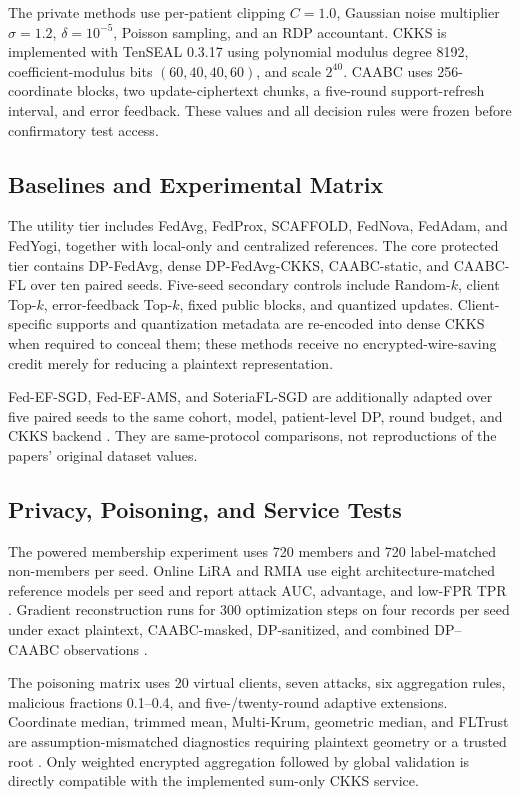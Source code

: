 \documentclass[conference]{IEEEtran}
\begin{document}
The private methods use per-patient clipping $C=1.0$, Gaussian noise multiplier
$\sigma=1.2$, $\delta=10^{-5}$, Poisson sampling, and an RDP accountant. CKKS is
implemented with TenSEAL 0.3.17 using polynomial modulus degree 8192,
coefficient-modulus bits $(60,40,40,60)$, and scale $2^{40}$. CAABC uses
256-coordinate blocks, two update-ciphertext chunks, a five-round support-refresh
interval, and error feedback. These values and all decision rules were frozen
before confirmatory test access.

\subsection{Baselines and Experimental Matrix}

The utility tier includes FedAvg, FedProx, SCAFFOLD, FedNova, FedAdam, and
FedYogi, together with local-only and centralized references. The core protected
tier contains DP-FedAvg, dense DP-FedAvg-CKKS, CAABC-static, and CAABC-FL over ten
paired seeds. Five-seed secondary controls include Random-$k$, client Top-$k$,
error-feedback Top-$k$, fixed public blocks, and quantized updates. Client-specific
supports and quantization metadata are re-encoded into dense CKKS when required
to conceal them; these methods receive no encrypted-wire-saving credit merely
for reducing a plaintext representation.

Fed-EF-SGD, Fed-EF-AMS, and SoteriaFL-SGD are additionally adapted over five
paired seeds to the same cohort, model, patient-level DP, round budget, and CKKS
backend \cite{li2023fedef,li2022soteriafl}. They are same-protocol comparisons,
not reproductions of the papers' original dataset values.

\subsection{Privacy, Poisoning, and Service Tests}

The powered membership experiment uses 720 members and 720 label-matched
non-members per seed. Online LiRA and RMIA use eight architecture-matched
reference models per seed and report attack AUC, advantage, and low-FPR TPR
\cite{carlini2022membership}. Gradient reconstruction runs for 300 optimization
steps on four records per seed under exact plaintext, CAABC-masked,
DP-sanitized, and combined DP--CAABC observations
\cite{zhu2019dlg,geiping2020inverting}.

The poisoning matrix uses 20 virtual clients, seven attacks, six aggregation
rules, malicious fractions 0.1--0.4, and five-/twenty-round adaptive extensions.
Coordinate median, trimmed mean, Multi-Krum, geometric median, and FLTrust are
assumption-mismatched diagnostics requiring plaintext geometry or a trusted root
\cite{blanchard2017krum,yin2018byzantine,pillutla2022robust,cao2021fltrust}.
Only weighted encrypted aggregation followed by global validation is directly
compatible with the implemented sum-only CKKS service.
\end{document}
